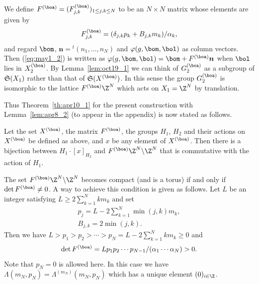 We def\/ine $F^{(\boa)} = (F^{(\boa)}_{j,k})_{1 \leq j,k \leq N}$ to be an $N \times N$ matrix whose elements are given by
\begin{equation}\label{eq:may15_1}
F^{(\boa)}_{j,k} = (\delta_{j,k} p_k + B_{j,k} m_k)/\alpha_k ,
\end{equation}
and regard $\bom$, $\boldsymbol{n} = {}^t (n_1,\ldots,n_N)$ and $\varphi(g,\bom,\bol)$ as column vectors.
Then (\ref{eq:may1_2}) is written as
$\varphi(g,\bom,\bol) = \bom + F^{(\boa)} \boldsymbol{n}$
when $\bol$ lies in $X_2^{(\boa)}$.
By Lemma~\ref{lem:oct19_1} we can
think of $G_2^{(\boa)}$ as a
subgroup of ${\frak S}(X_1)$ rather than that of ${\frak S}(X^{(\boa)})$.
In this sense the group $G_2^{(\boa)}$ is isomorphic to the lattice $F^{(\boa)} \Z^N$
which acts on $X_1 = \Z^N$ by translation.

Thus Theorem~\ref{th:apr10_1} for the present construction with Lemma~\ref{lem:apr8_2}
(to appear in the appendix)
is now stated as follows.
\begin{proposition}\label{prop:apr22_1}
Let the set $X^{(\boa)}$, the matrix $F^{(\boa)}$, the groups $H_1$, $H_2$ and their actions on $X^{(\boa)}$
be def\/ined as above, and
$x$ be any element of $X^{(\boa)}$.
Then there is a bijection between $H_1 \cdot [x]_{H_2}$ and $F^{(\boa)} \Z^N \backslash \Z^N$
that is commutative with the action of $H_1$.
\end{proposition}
The set $F^{(\boa)} \Z^N \backslash \Z^N$ becomes compact {(and is a torus)} if and only if $\det F^{(\boa)} \ne 0$.
A way to achieve this condition is given as follows.
Let $L$ be an integer satisfying $L \geq 2 \sum_{k=1}^N k m_k$ and set
\begin{gather}\label{eq:may15_2}
p_j = L - 2\sum_{k =1}^N \min(j,k)m_k,\\
B_{j,k} = 2 \min (j,k).\label{eq:may26_1}
\end{gather}
Then we have $L > p_1 > p_2 > \cdots > p_N = L - 2 \sum_{k=1}^N k m_k \geq 0$ and
\begin{equation*}
\det F^{(\boa)} = L p_1 p_2 \cdots p_{N-1}/(\alpha_1 \cdots \alpha_N) > 0.
\end{equation*}
Note that $p_N=0$ is allowed here.
In this case we have $\Lambda (m_N,p_N) = \Lambda^{(m_N)} (m_N,p_N)$ which has {a unique} element $(0)_{i \in \Z}$.

